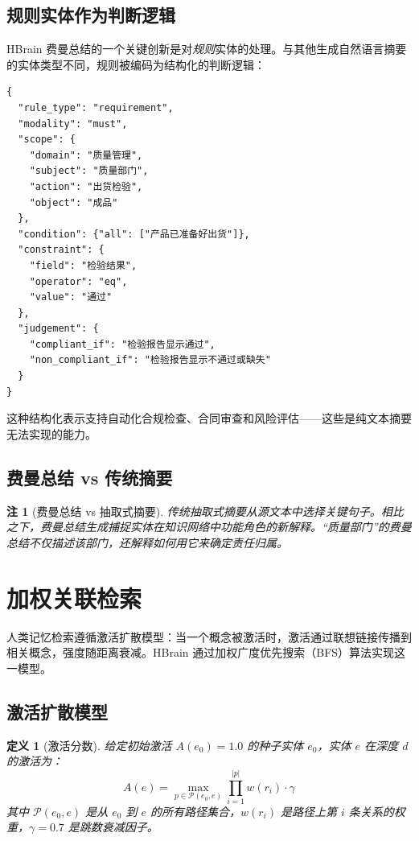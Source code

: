 \documentclass[11pt]{article}
\newtheorem{definition}{定义}
\newtheorem{remark}{注}
\begin{document}
\subsection{规则实体作为判断逻辑}

HBrain 费曼总结的一个关键创新是对\textit{规则}实体的处理。与其他生成自然语言摘要的实体类型不同，规则被编码为结构化的判断逻辑：

\begin{verbatim}
{
  "rule_type": "requirement",
  "modality": "must",
  "scope": {
    "domain": "质量管理",
    "subject": "质量部门",
    "action": "出货检验",
    "object": "成品"
  },
  "condition": {"all": ["产品已准备好出货"]},
  "constraint": {
    "field": "检验结果",
    "operator": "eq",
    "value": "通过"
  },
  "judgement": {
    "compliant_if": "检验报告显示通过",
    "non_compliant_if": "检验报告显示不通过或缺失"
  }
}
\end{verbatim}

这种结构化表示支持自动化合规检查、合同审查和风险评估——这些是纯文本摘要无法实现的能力。

\subsection{费曼总结 vs 传统摘要}

\begin{remark}[费曼总结 vs 抽取式摘要]
传统抽取式摘要从源文本中选择关键句子。相比之下，费曼总结生成捕捉实体在知识网络中\textit{功能角色}的新解释。“质量部门”的费曼总结不仅描述该部门，还解释如何用它来确定责任归属。
\end{remark}

\section{加权关联检索}
\label{sec:retrieval}

人类记忆检索遵循激活扩散模型：当一个概念被激活时，激活通过联想链接传播到相关概念，强度随距离衰减。HBrain 通过加权广度优先搜索（BFS）算法实现这一模型。

\subsection{激活扩散模型}

\begin{definition}[激活分数]
给定初始激活 $A(e_0) = 1.0$ 的种子实体 $e_0$，实体 $e$ 在深度 $d$ 的激活为：
\begin{equation}
A(e) = \max_{p \in \mathcal{P}(e_0, e)} \prod_{i=1}^{|p|} w(r_i) \cdot \gamma
\label{eq:activation}
\end{equation}
其中 $\mathcal{P}(e_0, e)$ 是从 $e_0$ 到 $e$ 的所有路径集合，$w(r_i)$ 是路径上第 $i$ 条关系的权重，$\gamma = 0.7$ 是跳数衰减因子。
\end{definition}
\end{document}
